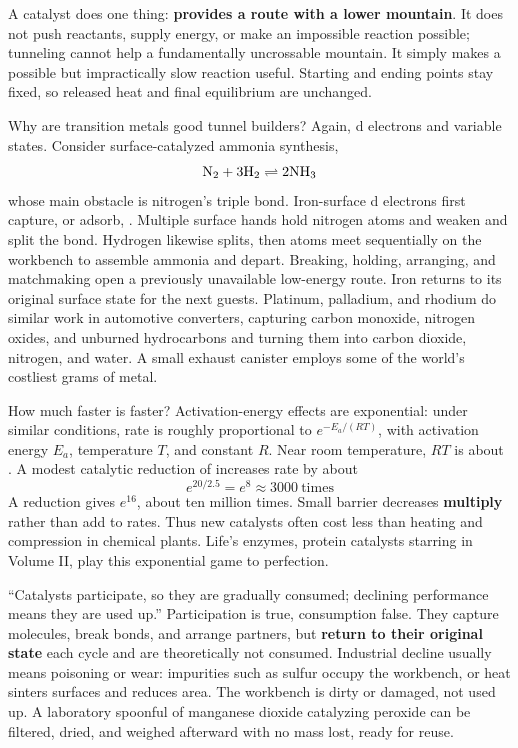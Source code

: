A catalyst does one thing: \textbf{provides a route with a lower mountain}. It does not push reactants, supply energy, or make an impossible reaction possible; tunneling cannot help a fundamentally uncrossable mountain. It simply makes a possible but impractically slow reaction useful. Starting and ending points stay fixed, so released heat and final equilibrium are unchanged.

Why are transition metals good tunnel builders? Again, d electrons and variable states. Consider surface-catalyzed ammonia synthesis,
\[\mathrm{N_2} + \mathrm{3H_2} \rightleftharpoons \mathrm{2NH_3}\]
whose main obstacle is nitrogen's triple bond. Iron-surface d electrons first capture, or adsorb, . Multiple surface hands hold nitrogen atoms and weaken and split the bond. Hydrogen likewise splits, then atoms meet sequentially on the workbench to assemble ammonia and depart. Breaking, holding, arranging, and matchmaking open a previously unavailable low-energy route. Iron returns to its original surface state for the next guests. Platinum, palladium, and rhodium do similar work in automotive converters, capturing carbon monoxide, nitrogen oxides, and unburned hydrocarbons and turning them into carbon dioxide, nitrogen, and water. A small exhaust canister employs some of the world's costliest grams of metal.

\begin{qiaoliang}
How much faster is faster? Activation-energy effects are exponential: under similar conditions, rate is roughly proportional to $e^{-E_a/(RT)}$, with activation energy $E_a$, temperature $T$, and constant $R$. Near room temperature, $RT$ is about . A modest catalytic reduction of  increases rate by about
\[e^{20/2.5} = e^{8} \approx 3000\ \text{times}\]
A  reduction gives $e^{16}$, about ten million times. Small barrier decreases \textbf{multiply} rather than add to rates. Thus new catalysts often cost less than heating and compression in chemical plants. Life's enzymes, protein catalysts starring in Volume II, play this exponential game to perfection.
\end{qiaoliang}

\begin{wuqu}
``Catalysts participate, so they are gradually consumed; declining performance means they are used up.'' Participation is true, consumption false. They capture molecules, break bonds, and arrange partners, but \textbf{return to their original state} each cycle and are theoretically not consumed. Industrial decline usually means poisoning or wear: impurities such as sulfur occupy the workbench, or heat sinters surfaces and reduces area. The workbench is dirty or damaged, not used up. A laboratory spoonful of manganese dioxide catalyzing peroxide can be filtered, dried, and weighed afterward with no mass lost, ready for reuse.
\end{wuqu}


